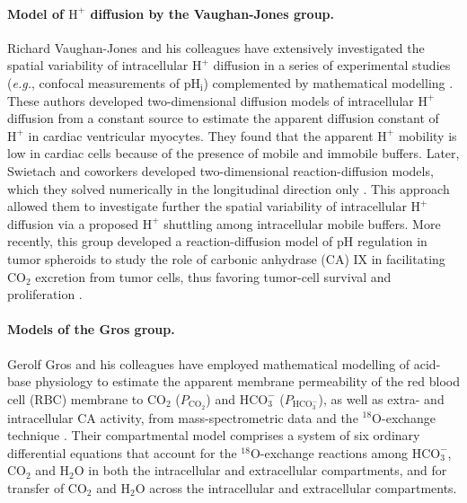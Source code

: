 \documentclass[fleqn,10pt]{physiome}
\begin{document}
\paragraph{Model of $\mathrm{H^+}$ diffusion by the Vaughan-Jones group.}

Richard Vaughan-Jones and his colleagues have extensively investigated the spatial variability of intracellular $\mathrm{H^+}$ diffusion in a series of experimental studies (\emph{e.g.}, confocal measurements of $\mathrm{pH_i}$) complemented by mathematical modelling \citep{vaughan2002intrinsic,zaniboni2003intracellular,swietach2003modelling}. These authors developed two-dimensional diffusion models of intracellular $\mathrm{H^+}$ diffusion from a constant source to estimate the apparent diffusion constant of $\mathrm{H^+}$ in cardiac ventricular myocytes. They found that the apparent $\mathrm{H^+}$ mobility is low in cardiac cells because of the presence of mobile and immobile buffers. Later, Swietach and coworkers developed two-dimensional reaction-diffusion models, which they solved numerically in the longitudinal direction only \citep{swietach2003modelling,swietach2005experimental}. This approach allowed them to investigate further the spatial variability of intracellular $\mathrm{H^+}$ diffusion via a proposed $\mathrm{H^+}$ shuttling among intracellular mobile buffers. More recently, this group developed a reaction-diffusion model of $\mathrm{pH}$ regulation in tumor spheroids to study the role of carbonic anhydrase (CA) IX in facilitating $\mathrm{CO_2}$ excretion from tumor cells, thus favoring tumor-cell survival and proliferation \citep{swietach2008tumor,swietach2009role}.

\paragraph{Models of the Gros group.}

Gerolf Gros and his colleagues have employed mathematical modelling of acid-base physiology to estimate the apparent membrane permeability of the red blood cell (RBC) membrane to $\mathrm{CO_2}$ ($P_\mathrm{CO_2}$) and $\mathrm{HCO_3^-}$ ($P_\mathrm{HCO_3^-}$), as well as extra- and intracellular CA activity, from mass-spectrometric data and the $^{18}$O-exchange technique \citep{wunder1997mathematical}. Their compartmental model comprises a system of six ordinary differential equations that account for the $^{18}$O-exchange reactions among $\mathrm{HCO_3^-}$, $\mathrm{CO_2}$ and $\mathrm{H_2O}$ in both the intracellular and extracellular compartments, and for transfer of $\mathrm{CO_2}$ and $\mathrm{H_2O}$ across the intracellular and extracellular compartments.
\end{document}
